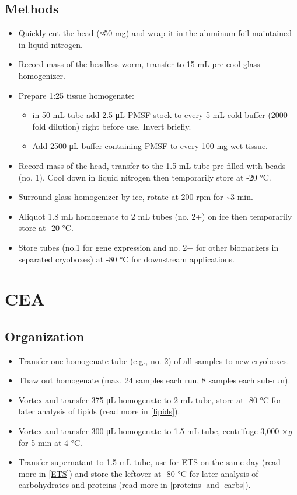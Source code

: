 \documentclass[
]{book}
\providecommand{\tightlist}{%
  \setlength{\itemsep}{0pt}\setlength{\parskip}{0pt}}
\begin{document}
\hypertarget{methods}{%
\section{Methods}\label{methods}}

\begin{itemize}
\item
  Quickly cut the head (≈50 mg) and wrap it in the aluminum foil maintained in liquid nitrogen.
\item
  Record mass of the headless worm, transfer to 15 mL pre-cool glass homogenizer.
\item
  Prepare 1:25 tissue homogenate:

  \begin{itemize}
  \item
    in 50 mL tube add 2.5 μL PMSF stock to every 5 mL cold buffer (2000-fold dilution) right before use. Invert briefly.
  \item
    Add 2500 μL buffer containing PMSF to every 100 mg wet tissue.
  \end{itemize}
\item
  Record mass of the head, transfer to the 1.5 mL tube pre-filled with beads (no. 1). Cool down in liquid nitrogen then temporarily store at -20 °C.
\item
  Surround glass homogenizer by ice, rotate at 200 rpm for \textasciitilde3 min.
\item
  Aliquot 1.8 mL homogenate to 2 mL tubes (no. 2+) on ice then temporarily store at -20 °C.
\item
  Store tubes (no.1 for gene expression and no. 2+ for other biomarkers in separated cryoboxes) at -80 °C for downstream applications.
\end{itemize}

\hypertarget{cea}{%
\chapter{CEA}\label{cea}}

\hypertarget{organization}{%
\section{Organization}\label{organization}}

\begin{itemize}
\tightlist
\item
  Transfer one homogenate tube (e.g., no. 2) of all samples to new cryoboxes.
\item
  Thaw out homogenate (max. 24 samples each run, 8 samples each sub-run).
\item
  Vortex and transfer 375 μL homogenate to 2 mL tube, store at -80 °C for later analysis of lipids (read more in \ref{lipids}).
\item
  Vortex and transfer 300 μL homogenate to 1.5 mL tube, centrifuge 3,000 ×\emph{g} for 5 min at 4 °C.
\item
  Transfer supernatant to 1.5 mL tube, use for ETS on the same day (read more in \ref{ETS}) and store the leftover at -80 °C for later analysis of carbohydrates and proteins (read more in \ref{proteins} and \ref{carbs}).
\end{itemize}
\end{document}
